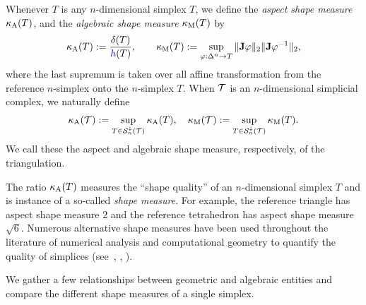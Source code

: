 \documentclass[10pt,a4paper]{article}
\begin{document}
Whenever $T$ is any $n$-dimensional simplex $T$,
we define the \textit{aspect shape measure} $\kappa_{\rm A}(T)$,
and 
the \textit{algebraic shape measure} $\kappa_{\rm M}(T)$
by 
\begin{align}\label{math:shapemeasure}
    \aspectratio(T)
    := 
    \frac{ \diam(T) }{ \height(T) }
    ,
    \qquad 
    \algebraicshapemeasure(T)
    := 
    \sup_{ \varphi : \Delta^n \rightarrow T } 
    \matnorm{\Jacobian \varphi} \matnorm{ \Jacobian \varphi^{-1} }
    ,
\end{align}
where the last supremum is taken over all affine transformation from the reference $n$-simplex onto the $n$-simplex $T$. 
When ${\mathcal T}$ is an $n$-dimensional simplicial complex, we naturally define 
\begin{align}\label{math:shapemeasure:triangulation}
    \kappa_{\rm A}({\mathcal T}) := \sup_{ T \in {\mathcal S}^{\downarrow}_{n}({\mathcal T}) } \kappa_{\rm A}(T)
    ,
    \quad 
    \kappa_{\rm M}({\mathcal T}) := \sup_{ T \in {\mathcal S}^{\downarrow}_{n}({\mathcal T}) } \kappa_{\rm M}(T)
    .
\end{align}
We call these the aspect and algebraic shape measure, respectively, of the triangulation. 

\begin{remark}
    The ratio $\kappa_{\rm A}(T)$ measures the ``shape quality'' of an $n$-dimensional simplex $T$ and is instance of a so-called \emph{shape measure}.
    For example, the reference triangle has aspect shape measure $2$ and the reference tetrahedron has aspect shape measure $\sqrt{6}$. 
    Numerous alternative shape measures have been used throughout the literature of numerical analysis and computational geometry to quantify the quality of simplices (see~\cite[p.61, Definition 5.1]{braess2001finite}, 
    \cite[p.97, Definition 4.2.16 ]{brenner2008mathematical}, %
    \cite[Definition~11.2]{ern2021finite}). 
\end{remark}

We gather a few relationships between geometric and algebraic entities and compare the different shape measures of a single simplex.
\end{document}
